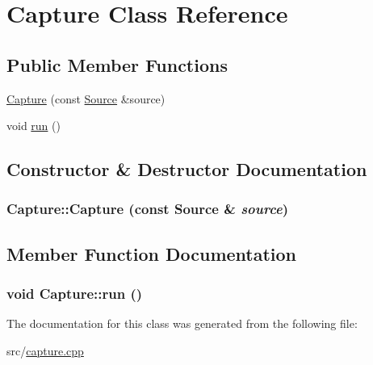 \hypertarget{class_capture}{
\section{Capture Class Reference}
\label{class_capture}
}
\subsection*{Public Member Functions}
\begin{DoxyCompactItemize}
\item 
\hyperlink{class_capture_a77272498fbe1485e894cc3a4b0a3d90d}{Capture} (const \hyperlink{class_source}{Source} \&source)
\item 
void \hyperlink{class_capture_afad27cc4bb92fe56914bfee7745d091d}{run} ()
\end{DoxyCompactItemize}


\subsection{Constructor \& Destructor Documentation}
\hypertarget{class_capture_a77272498fbe1485e894cc3a4b0a3d90d}{
\subsubsection[{Capture}]{\setlength{\rightskip}{0pt plus 5cm}Capture::Capture (const {\bf Source} \& {\em source})}}
\label{class_capture_a77272498fbe1485e894cc3a4b0a3d90d}


\subsection{Member Function Documentation}
\hypertarget{class_capture_afad27cc4bb92fe56914bfee7745d091d}{
\subsubsection[{run}]{\setlength{\rightskip}{0pt plus 5cm}void Capture::run ()}}
\label{class_capture_afad27cc4bb92fe56914bfee7745d091d}


The documentation for this class was generated from the following file:\begin{DoxyCompactItemize}
\item 
src/\hyperlink{capture_8cpp}{capture.cpp}\end{DoxyCompactItemize}
